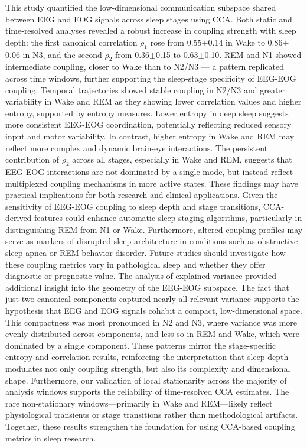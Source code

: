 This study quantified the low-dimensional communication subspace shared between EEG and EOG signals across sleep stages using CCA. Both static and time-resolved analyses revealed a robust increase in coupling strength with sleep depth: the first canonical correlation $\rho_1$ rose from 0.55$\pm$0.14 in Wake to 0.86$\pm$0.06 in N3, and the second $\rho_2$ from 0.36$\pm$0.15 to 0.63$\pm$0.10. REM and N1 showed intermediate coupling, closer to Wake than to N2/N3 --- a pattern replicated across time windows, further supporting the sleep-stage specificity of EEG-EOG coupling.
Temporal trajectories showed stable coupling in N2/N3 and greater variability in Wake and REM as they showing lower correlation values and higher entropy, supported by entropy measures. Lower entropy in deep sleep suggests more consistent EEG-EOG coordination, potentially reflecting reduced sensory input and motor variability. In contrast, higher entropy in Wake and REM may reflect more complex and dynamic brain-eye interactions. The persistent contribution of $\rho_2$ across all stages, especially in Wake and REM, suggests that EEG-EOG interactions are not dominated by a single mode, but instead reflect multiplexed coupling mechanisms in more active states. These findings may have practical implications for both research and clinical applications. Given the sensitivity of EEG-EOG coupling to sleep depth and stage transitions, CCA-derived features could enhance automatic sleep staging algorithms, particularly in distinguishing REM from N1 or Wake. Furthermore, altered coupling profiles may serve as markers of disrupted sleep architecture in conditions such as obstructive sleep apnea or REM behavior disorder. Future studies should investigate how these coupling metrics vary in pathological sleep and whether they offer diagnostic or prognostic value.
The analysis of explained variance provided additional insight into the geometry of the EEG-EOG subspace. The fact that just two canonical components captured nearly all relevant variance supports the hypothesis that EEG and EOG signals cohabit a compact, low-dimensional space. This compactness was most pronounced in N2 and N3, where variance was more evenly distributed across components, and less so in REM and Wake, which were dominated by a single component. These patterns mirror the stage-specific entropy and correlation results, reinforcing the interpretation that sleep depth modulates not only coupling strength, but also its complexity and dimensional shape.
Furthermore, our validation of local stationarity across the majority of analysis windows supports the reliability of time-resolved CCA estimates. The rare non-stationary windows—primarily in Wake and REM—likely reflect physiological transients or stage transitions rather than methodological artifacts. Together, these results strengthen the foundation for using CCA-based coupling metrics in sleep research.

